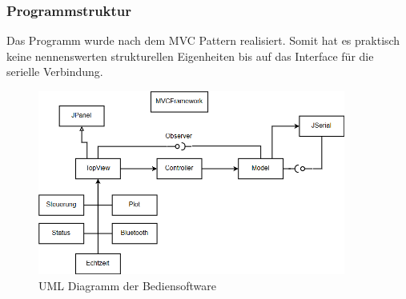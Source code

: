 \subsubsection*{Programmstruktur}

Das Programm wurde nach dem MVC Pattern realisiert. Somit hat es praktisch keine nennenswerten strukturellen Eigenheiten bis auf das Interface für die serielle Verbindung. 

\begin{figure}[H]
\begin{center}
\includegraphics[width=0.9\textwidth]{images/Software_UML.png}
\caption{UML Diagramm der Bediensoftware}
\end{center}
\end{figure}
